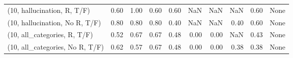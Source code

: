\begin{table*}[h!]
\begin{adjustbox}{width=2\columnwidth,center}
\begin{tabular}{lrrr|rrr|rrr}
(10, hallucination, R, T/F)           &                      0.60 &                  1.00 &                      0.60 &                          0.60 &                       NaN &                           NaN &                                    NaN &                               0.60 &                                  None \\
(10, hallucination, No R, T/F)        &                      0.80 &                  0.80 &                      0.80 &                          0.40 &                       NaN &                           NaN &                                   0.40 &                               0.60 &                                  None \\
(10, all\_categories, R, T/F)          &                      0.52 &                  0.67 &                      0.67 &                          0.48 &                      0.00 &                          0.00 &                                    NaN &                               0.43 &                                  None \\
(10, all\_categories, No R, T/F)       &                      0.62 &                  0.57 &                      0.67 &                          0.48 &                      0.00 &                          0.00 &                                   0.38 &                               0.38 &                                  None \\




\end{tabular}
\end{adjustbox}
\end{table*}
